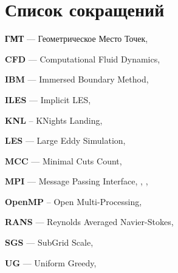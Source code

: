 \newpage

\section*{Список сокращений}

\textbf{ГМТ} --- Геометрическое Место Точек, \pageref{abbr:gmt}

\textbf{CFD} --- Computational Fluid Dynamics, \pageref{abbr:cfd}

\textbf{IBM} --- Immersed Boundary Method, \pageref{abbr:ibm}

\textbf{ILES} --- Implicit LES, \pageref{abbr:iles}

\textbf{KNL} -- KNights Landing, \pageref{abbr:knl}

\textbf{LES} --- Large Eddy Simulation, \pageref{abbr:les}

\textbf{MCC} --- Minimal Cuts Count, \pageref{abbr:mcc}

\textbf{MPI} --- Message Passing Interface, \pageref{abbr:mpi}, \pageref{abbr:mpi2}, \pageref{abbr:mpi3}

\textbf{OpenMP} -- Open Multi-Processing, \pageref{abbr:openmp}

\textbf{RANS} --- Reynolds Averaged Navier-Stokes, \pageref{abbr:rans}

\textbf{SGS} --- SubGrid Scale, \pageref{abbr:sgs}

\textbf{UG} --- Uniform Greedy, \pageref{abbr:ug}
